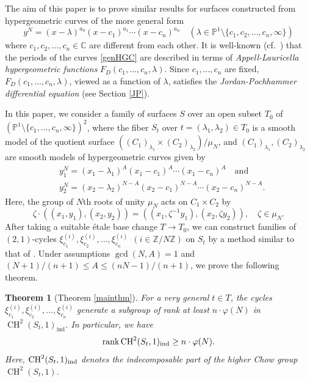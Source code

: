 \documentclass[letterpaper, 11pt]{amsart}
\theoremstyle{my theoremstyle}
\newtheorem{thm}{Theorem}[section]
\theoremstyle{dfn}
\theoremstyle{remark}
\renewcommand{\1}{\mathbbm{1}}
\newcommand{\C}{\mathbb{C}}
\newcommand{\Z}{\mathbb{Z}}
\renewcommand{\P}{\mathbb{P}}
\renewcommand{\l}{\lambda}
\newcommand{\rk}{\operatorname{rank}}
\newcommand{\ch}{\operatorname{CH}}
\numberwithin{equation}{section}
\begin{document}
The aim of this paper is to prove similar results for surfaces constructed from hypergeometric curves of the more general form
\begin{equation}\label{genHGC}
y^N=(x-\l)^{a_0}(x-c_1)^{a_1} \cdots (x-c_n)^{a_n} \quad (\l \in \P^1 \setminus \{c_1, c_2,\ldots, c_n, \infty\})
\end{equation}
where $c_1,c_2,\dots,c_n\in \C$ are different from each other.
It is well-known (cf.~\cite{Archinard}) that the periods of the curves \eqref{genHGC} are described in terms of \textit{Appell-Lauricella hypergeometric functions} $F_D(c_1, \ldots, c_n,\l)$.
Since $c_1,\dots, c_n$ are fixed, $F_D(c_1, \ldots, c_n,\l)$, viewed as a function of 
$\l$, satisfies the \textit{Jordan-Pochhammer differential equation} (see Section \ref{JP}).

In this paper, we consider a family of surfaces $S$ over an open subset $T_0$ of $(\mathbb{P}^1\setminus\{c_1,\dots, c_n,\infty\})^2$, where the fiber $S_t$ over $t=(\l_1,\l_2)\in T_0$ is a smooth model of the quotient surface $((C_1)_{\l_1} \times (C_2)_{\l_2})/\mu_N$, and $(C_1)_{\l_1},(C_2)_{\l_2}$ are smooth models of hypergeometric curves given by
\begin{align*}
&y_1^N = (x_1-\l_1)^A(x_1-c_1)^A\cdots(x_1-c_n)^A  \quad\text{and} \\
&y_2^N = (x_2-\l_2)^{N-A}(x_2-c_1)^{N-A}\cdots(x_2-c_n)^{N-A}.
\end{align*}
Here, the group of $N$th roots of unity $\mu_N$ acts on $C_1 \times C_2$ by 
$$\zeta \cdot ((x_1, y_1), (x_2, y_2)) = ((x_1, \zeta^{-1}y_1), (x_2, \zeta y_2)), \quad \zeta \in \mu_N. $$
After taking a suitable \'etale base change $T\to T_0$, we can construct families of $(2,1)$-cycles $\xi_{c_1}^{(i)},\xi_{c_2}^{(i)},\dots, \xi_{c_n}^{(i)}\:\:(i\in \Z/N\Z)$ on $S_t$ by a method similar to that of \cite{NS}.
Under assumptions $\gcd(N, A)=1$ and $(N+1)/(n+1) \leq A \leq (nN-1)/(n+1)$, we prove the following theorem. 

\begin{thm}[Theorem \ref{mainthm}]\label{mainthmintro}
For a very general $t\in T$, the cycles $\xi_{c_1}^{(i)},\xi_{c_2}^{(i)},\dots, \xi_{c_n}^{(i)}$ generate a subgroup of rank at least $n\cdot \varphi(N)$ in $\ch^2(S_t,1)_{\mathrm{ind}}$.
In particular, we have
$$\rk \ch^2(S_t, 1)_{\rm ind} \ge n \cdot \varphi(N). $$
Here, $\ch^2(S_t, 1)_{\rm ind}$ denotes the indecomposable part of the higher Chow group $\ch^2(S_t, 1)$. 
\end{thm}
\end{document}
